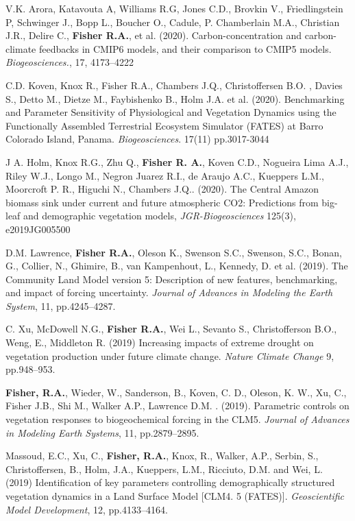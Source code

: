 \documentclass[10pt]{article}
\newenvironment{lonelist}[1][\enskip\textbullet]%
        {\vspace{-\baselineskip}\begin{list}{#1}{%
        \setlength{\itemindent}{-3pt} 
        \setlength{\partopsep}{0pt}%
        \setlength{\leftmargin}{10pt}
        \setlength{\topsep}{15pt}}}
        {\end{list}\vspace{-.3\baselineskip}}
\begin{document}
\begin{lonelist}
\item[51] {V.K. Arora, Katavouta A,  Williams R.G, Jones C.D., Brovkin V., Friedlingstein P, Schwinger J., Bopp L., Boucher O., Cadule, P. Chamberlain M.A., Christian J.R., Delire C., \textbf{Fisher R.A.}, et al. (2020). Carbon-concentration and carbon-climate feedbacks in CMIP6 models, and their comparison to CMIP5 models. \emph{Biogeosciences.}, 17, 4173–4222}

\item[50]  C.D. Koven, Knox R., Fisher R.A., Chambers J.Q., Christoffersen B.O. , Davies S., Detto M., Dietze M., Faybishenko B., Holm J.A. et al. (2020). Benchmarking and Parameter Sensitivity of Physiological and Vegetation Dynamics using the Functionally Assembled Terrestrial Ecosystem Simulator (FATES) at Barro Colorado Island, Panama. \emph{Biogeosciences}. 17(11) pp.3017-3044

\item[49]  J A. Holm, Knox R.G., Zhu Q., \textbf{Fisher R. A.}, Koven C.D., Nogueira Lima A.J., Riley W.J., Longo M., Negron Juarez R.I., de Araujo A.C., Kueppers L.M., Moorcroft P. R., Higuchi N., Chambers J.Q.. (2020). The Central Amazon biomass sink under current and future atmospheric CO2: Predictions from big-leaf and demographic vegetation models, \emph{JGR-Biogeosciences}  125(3), e2019JG005500

\item[48]  D.M. Lawrence, \textbf{Fisher R.A.}, Oleson K., Swenson S.C., Swenson, S.C., Bonan, G., Collier, N., Ghimire, B., van Kampenhout, L., Kennedy, D.  et al. (2019). The Community Land Model version 5: Description of new features, benchmarking, and impact of forcing uncertainty.   \emph{ Journal of Advances in Modeling the Earth System}, 11, pp.4245–4287. 

\item [47] C. Xu, McDowell N.G., \textbf{Fisher R.A.}, Wei L., Sevanto S., Christofferson B.O., Weng, E., Middleton R. (2019) Increasing impacts of extreme drought on vegetation production under future climate change.  \emph{Nature Climate Change}  9, pp.948–953.

\item[46]  \textbf{Fisher, R.A.}, Wieder, W., Sanderson, B., Koven, C. D., Oleson, K. W., Xu, C., Fisher J.B., Shi M., Walker A.P., Lawrence D.M. . (2019). Parametric controls on vegetation responses to biogeochemical forcing in the CLM5. \emph{Journal of Advances in Modeling Earth Systems}, 11, pp.2879–2895.

\item[45]  Massoud, E.C., Xu, C., \textbf{Fisher, R.A.}, Knox, R., Walker, A.P., Serbin, S., Christoffersen, B., Holm, J.A., Kueppers, L.M., Ricciuto, D.M. and Wei, L. (2019) Identification of key parameters controlling demographically structured vegetation dynamics in a Land Surface Model [CLM4. 5 (FATES)].
\emph{Geoscientific Model Development}, 12, pp.4133–4164. 


\end{lonelist}
\end{document}

